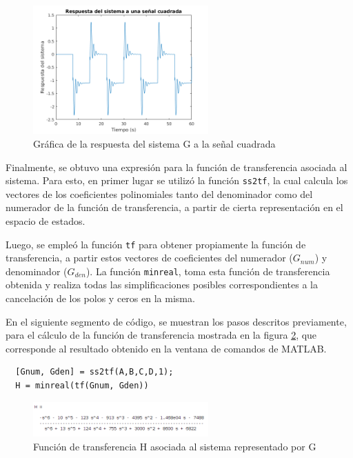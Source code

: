 \documentclass[12pt,letterpaper]{article}
\begin{document}
\begin{figure}[ht!]
	\centering
	\includegraphics[width=0.6\textwidth]{pictures/Ejercicio5/respuesta_onda_cuadrada}
	\caption{Gráfica de la respuesta del sistema G a la señal cuadrada}
	\label{fig:respuesta_onda_cuadrada}
\end{figure} 

Finalmente, se obtuvo una expresión para la función de transferencia asociada al sistema. Para esto,
en primer lugar se utilizó la función \texttt{ss2tf}, la cual calcula los vectores de los
coeficientes polinomiales tanto del denominador como del numerador de la función de transferencia, 
a partir de cierta representación en el espacio de estados. 

Luego, se empleó la función \texttt{tf} para obtener propiamente la función de transferencia, a partir estos 
vectores de coeficientes del numerador ($G_{num}$) y denominador ($G_{den}$). La función
\texttt{minreal}, toma esta función de transferencia obtenida y realiza todas las simplificaciones
posibles correspondientes a la cancelación de los polos y ceros en la misma.

En el siguiente segmento de código, se muestran los pasos descritos previamente, para el cálculo de
la función de transferencia mostrada en la figura \ref{fig:func_transferencia_H}, que corresponde al resultado obtenido en la
ventana de comandos de MATLAB.

\begin{lstlisting}[style=Matlab-editor, basicstyle=\mlttfamily]
  % Funcion de transferencia
  [Gnum, Gden] = ss2tf(A,B,C,D,1);
  H = minreal(tf(Gnum, Gden))
\end{lstlisting}

\begin{figure}[ht!]
	\centering
	\includegraphics[width=0.6\textwidth]{pictures/Ejercicio5/func_transferencia}
	\caption{Función de transferencia H asociada al sistema representado por G}
	\label{fig:func_transferencia_H}
\end{figure} 
\end{document}
